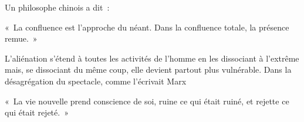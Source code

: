 \documentclass[french,twoside]{book} %
\newenvironment{quoteblock}%
  {\begin{quoting}}
  {\end{quoting}}
\newenvironment{quotebar}{%
    \def\FrameCommand{{\color{rubric!10!}\vrule width 0.5em} \hspace{0.9em}}%
    \def\OuterFrameSep{\itemsep} %
    \MakeFramed {\advance\hsize-\width \FrameRestore}
  }%
  {%
    \endMakeFramed
  }
\renewenvironment{quoteblock}%
  {%
    \savenotes
    \setstretch{0.9}
    \normalfont
    \begin{quotebar}
  }
  {%
    \end{quotebar}
    \spewnotes
  }
\begin{document}
\noindent Un philosophe chinois a dit :\par

\begin{quoteblock}
\noindent « La confluence est l’approche du néant. Dans la confluence totale, la présence remue. »\end{quoteblock}

\noindent L’aliénation s’étend à toutes les activités de l’homme en les dissociant à l’extrême mais, se dissociant du même coup, elle devient partout plus vulnérable. Dans la désagrégation du spectacle, comme l’écrivait Marx\par

\begin{quoteblock}
\noindent « La vie nouvelle prend conscience de soi, ruine ce qui était ruiné, et rejette ce qui était rejeté. »\end{quoteblock}
\end{document}
